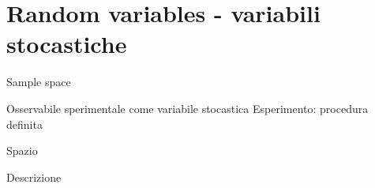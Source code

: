\section{Random variables - variabili stocastiche}

\begin{frame}{Sample space}

\begin{block}{Osservabile sperimentale come variabile stocastica}
Esperimento: procedura definita
\end{block}

\begin{block}{Spazio }

\end{block}

\end{frame}

\begin{wordonframe}{Descrizione}



\end{wordonframe}